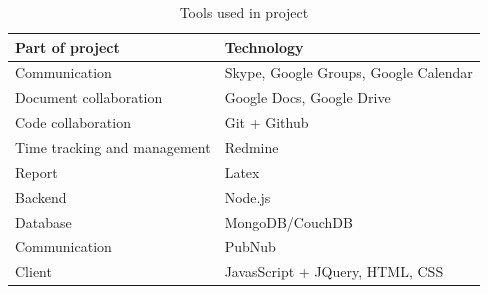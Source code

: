 \begin{table}
\centering
\begin{tabular}{ l l}
\textbf{Part of project}  & \textbf{Technology} \\
\hline
Communication & Skype, Google Groups, Google Calendar \\
Document collaboration & Google Docs, Google Drive \\
Code collaboration & Git + Github \\
Time tracking and management & Redmine \\
Report & Latex \\
Backend & Node.js \\
Database & MongoDB/CouchDB \\
Communication & PubNub \\
Client & JavasScript + JQuery, HTML, CSS \\
\hline
\end{tabular}
\caption{Tools used in project}
\label{table-tools}
\end{table}
